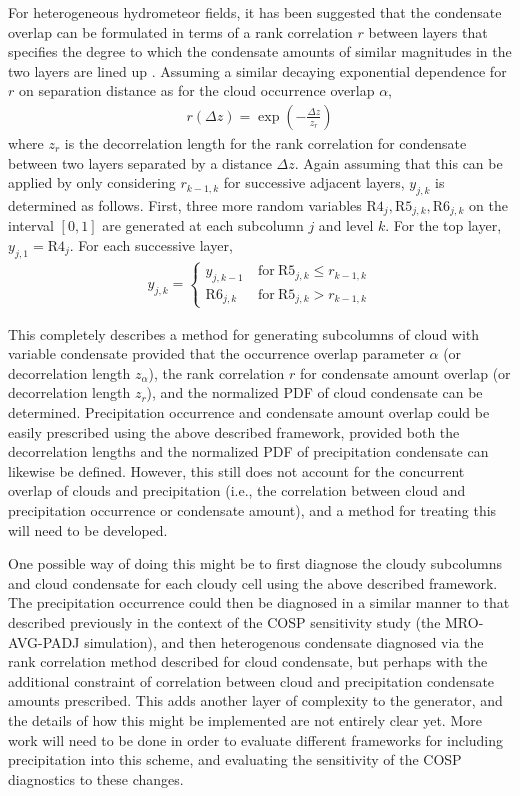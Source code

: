 \documentclass[letter]{article}
\begin{document}
For heterogeneous hydrometeor fields, it has been suggested that the condensate overlap can be formulated in terms of a rank correlation $r$ between layers that specifies the degree to which the condensate amounts of similar magnitudes in the two layers are lined up \citep[e.g.,][]{raisanen_et_al_2004,pincus_et_al_2005}. Assuming a similar decaying exponential dependence for $r$ on separation distance as for the cloud occurrence overlap $\alpha$,
\begin{gather}
    r(\Delta z) = \exp\left(-\frac{\Delta z}{z_r}\right)
    \label{r_z}
\end{gather}
where $z_r$ is the decorrelation length for the rank correlation for condensate between two layers separated by a distance $\Delta z$. Again assuming that this can be applied by only considering $r_{k-1,k}$ for successive adjacent layers, $y_{j,k}$ is determined as follows. First, three more random variables $\text{R4}_{j},\text{R5}_{j,k},\text{R6}_{j,k}$ on the interval $[0,1]$ are generated at each subcolumn $j$ and level $k$. For the top layer, $y_{j,1} = \text{R4}_{j}$. For each successive layer,
\begin{gather}
    y_{j,k} = \begin{cases}
        y_{j,k-1} & ~\text{for}~\text{R5}_{j,k} \le r_{k-1,k} \\
        \text{R6}_{j,k} & ~\text{for}~\text{R5}_{j,k} > r_{k-1,k}
    \end{cases}
\end{gather}

This completely describes a method for generating subcolumns of cloud with variable condensate provided that the occurrence overlap parameter $\alpha$ (or decorrelation length $z_{\alpha}$), the rank correlation $r$ for condensate amount overlap (or decorrelation length $z_{r}$), and the normalized PDF of cloud condensate can be determined. Precipitation occurrence and condensate amount overlap could be easily prescribed using the above described framework, provided both the decorrelation lengths and the normalized PDF of precipitation condensate can likewise be defined. However, this still does not account for the concurrent overlap of clouds and precipitation (i.e., the correlation between cloud and precipitation occurrence or condensate amount), and a method for treating this will need to be developed. 

One possible way of doing this might be to first diagnose the cloudy subcolumns and cloud condensate for each cloudy cell using the above described framework. The precipitation occurrence could then be diagnosed in a similar manner to that described previously in the context of the COSP sensitivity study (the MRO-AVG-PADJ simulation), and then heterogenous condensate diagnosed via the rank correlation method described for cloud condensate, but perhaps with the additional constraint of correlation between cloud and precipitation condensate amounts prescribed. This adds another layer of complexity to the generator, and the details of how this might be implemented are not entirely clear yet. More work will need to be done in order to evaluate different frameworks for including precipitation into this scheme, and evaluating the sensitivity of the COSP diagnostics to these changes.
\end{document}
